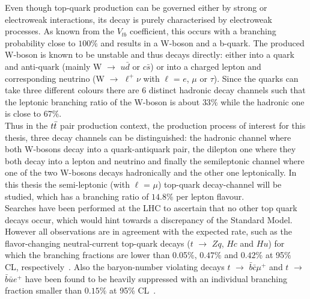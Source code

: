 Even though top-quark production can be governed either by strong or electroweak interactions, its decay is purely characterised by electroweak processes. As known from the $V_{tb}$ coefficient, this occurs with a branching probability close to $100\%$ and results in a W-boson and a b-quark. 
The produced W-boson is known to be unstable and thus decays directly: either into a quark and anti-quark (mainly W $\rightarrow$ $u\bar{d}$ or $c\bar{s}$) or into a charged lepton and corresponding neutrino (W $\rightarrow$ $\ell^{+}\nu$ with $\ell$ = $e$, $\mu$ or $\tau$).
Since the quarks can take three different colours there are 6 distinct hadronic decay channels such that the leptonic branching ratio of the W-boson is about $33\%$ while the hadronic one is close to $67\%$. %
\\
Thus in the $t\bar{t}$ pair production context, the production process of interest for this thesis, three decay channels can be distinguished: the hadronic channel where both W-bosons decay into a quark-antiquark pair, the dilepton one where they both decay into a lepton and neutrino and finally the semileptonic channel where one of the two W-bosons decays hadronically and the other one leptonically. 
In this thesis the semi-leptonic (with $\ell$ = $\mu$) top-quark decay-channel will be studied, which has a branching ratio of $14.8\%$ per lepton flavour.
\\

Searches have been performed at the LHC to ascertain that no other top quark decays occur, which would hint towards a discrepancy of the Standard Model. However all observations are in agreement with the expected rate, such as the flavor-changing neutral-current top-quark decays ($t$ $\rightarrow$ $Zq$, $Hc$ and $Hu$) for which the branching fractions are lower than 0.05$\%$, $0.47\%$ and $0.42\%$ at 95$\%$ CL, respectively~\cite{CMStZqDecayBR, CMStHqDecayBR}. Also the baryon-number violating decays $t$ $\rightarrow$ $\bar{b}\bar{c}\mu^{+}$ and $t$ $\rightarrow$ $\bar{b}\bar{u} e^{+}$ have been found to be heavily suppressed with an individual branching fraction smaller than $0.15\%$ at 95\% CL~\cite{CMSBNVDecayBR}.
\\

